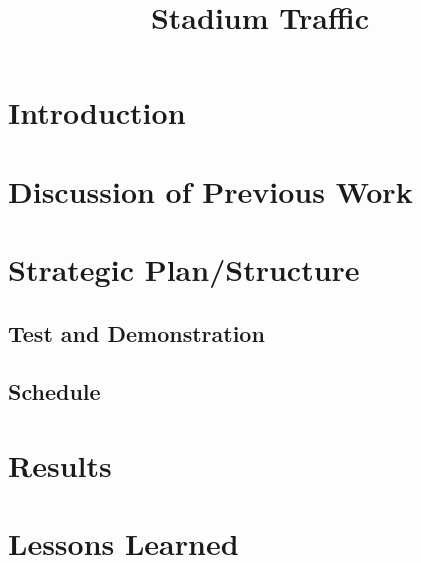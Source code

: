 \documentclass[12pt]{article}
\title{Stadium Traffic}
\begin{document}
\maketitle
\abstract



\newpage

\tableofcontents

\newpage

\mainmatter

\section{Introduction}



\section{Discussion of Previous Work}




\section{Strategic Plan/Structure}




\subsection{Test and Demonstration}



\subsection{Schedule}



\section{Results}



\section{Lessons Learned}


\end{document}
